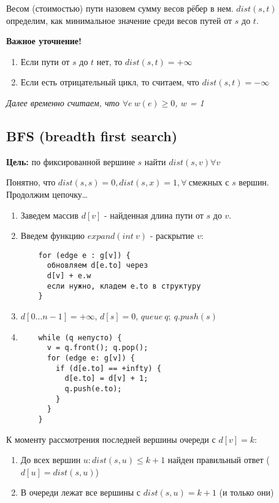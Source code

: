 \begin{definition}
  Весом (стоимостью) пути назовем сумму весов рёбер в нем. $dist(s, t)$ определим, как минимальное значение среди весов путей от $s$ до $t$.
\end{definition}
\textbf{Важное уточнение!}

\begin{note}
\begin{enumerate}
  \text{}

  \item Если пути от $s$ до $t$ нет, то $dist(s, t) = +\infty$
  \item Если есть отрицательный цикл, то считаем, что $dist(s, t) = -\infty$
\end{enumerate}
\end{note}

\textit{Далее временно считаем, что $\forall e \ w(e) \ge 0$, $w$ = 1}

\subsection{BFS (breadth first search)}
\textbf{Цель:} по фиксированной вершине $s$ найти $dist(s, v) \forall v$


Понятно, что $dist (s, s) = 0, dist (s, x) = 1, \forall \ \text{смежных с $s$ вершин.}$ Продолжим цепочку\dots

\begin{enumerate}
  \item Заведем массив $d[v]$ - найденная длина пути от $s$ до $v$.
  \item Введем функцию $expand(int\ v)$ - раскрытие $v$:
  \begin{verbatim}
    for (edge e : g[v]) {
      обновляем d[e.to] через
      d[v] + e.w
      если нужно, кладем e.to в структуру
    }
  \end{verbatim}

  \item $d[0\dots n - 1] = +\infty$, $d[s] = 0$, $queue \ q;\  q.push(s)$
  \item \begin{verbatim}
    while (q непусто) {
      v = q.front(); q.pop();
      for (edge e: g[v]) {
        if (d[e.to] == +infty) {
          d[e.to] = d[v] + 1;
          q.push(e.to);
        }
      }
    }
  \end{verbatim} 
\end{enumerate}

\begin{proposition}
  К моменту рассмотрения последней вершины очереди с $d[v] = k$:
  \begin{enumerate}
    \item До всех вершин $u: dist(s, u) \leq k + 1$ найден правильный ответ ($d[u] = dist(s, u)$)
    \item В очереди лежат все вершины с $dist(s, u) = k + 1$ (и только они)
  \end{enumerate}
\end{proposition}

